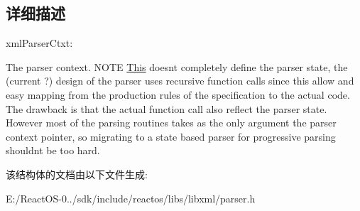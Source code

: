 \subsection{详细描述}
xml\+Parser\+Ctxt\+:

The parser context. N\+O\+TE \hyperlink{namespace_this}{This} doesn\textquotesingle{}t completely define the parser state, the (current ?) design of the parser uses recursive function calls since this allow and easy mapping from the production rules of the specification to the actual code. The drawback is that the actual function call also reflect the parser state. However most of the parsing routines takes as the only argument the parser context pointer, so migrating to a state based parser for progressive parsing shouldn\textquotesingle{}t be too hard. 

该结构体的文档由以下文件生成\+:\begin{DoxyCompactItemize}
\item 
E\+:/\+React\+O\+S-\/0../sdk/include/reactos/libs/libxml/parser.\+h\end{DoxyCompactItemize}
